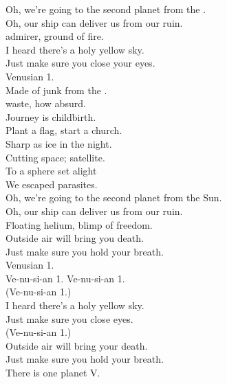 Oh, we're going to the second planet from the . \\
Oh, our ship can deliver us from our ruin. \\

 admirer, ground of fire. \\
I heard there's a holy yellow sky. \\
Just make sure you close your eyes. \\
Venusian 1. \\

Made of junk from the . \\
 waste, how absurd. \\
Journey is childbirth. \\
Plant a flag, start a church. \\
Sharp as ice in the night. \\
Cutting space; satellite. \\
To a sphere set alight \\
We escaped parasites. \\

Oh, we're going to the second planet from the Sun. \\
Oh, our ship can deliver us from our ruin. \\

Floating helium, blimp of freedom. \\
Outside air will bring you death. \\
Just make sure you hold your breath. \\
Venusian 1. \\

Ve-nu-si-an 1. Ve-nu-si-an 1. \\

(Ve-nu-si-an 1.) \\
I heard there's a holy yellow sky. \\
Just make sure you close eyes. \\

(Ve-nu-si-an 1.) \\
Outside air will bring your death. \\
Just make sure you hold your breath. \\

There is one planet V. \\



